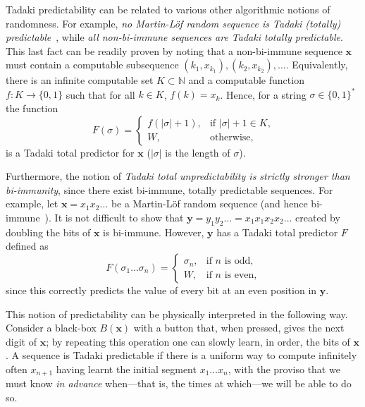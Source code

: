 \documentclass[%
 superscriptaddress,
 preprint,
 showpacs,
 showkeys,
 preprintnumbers,
 nofootinbib,
  amsmath,amssymb,
  aps,
 pra,
  longbibliography,
  floatfix,
 ]{revtex4-1}
\theoremstyle{definition}
\newcommand{\N}{\mathbb{N}}%
\newcommand{\x}{\mathbf{x}}
\newcommand{\y}{\mathbf{y}}
\begin{document}
Tadaki predictability can be related to various other algorithmic notions of randomness.
For example, \emph{no Martin-L\"of random sequence is Tadaki (totally) predictable}~\cite[Theorem~4]{Tadaki14}, while \emph{all non-bi-immune sequences are Tadaki totally predictable}.
This last fact can be readily proven by noting that a non-bi-immune sequence $\x$ must contain a computable subsequence $(k_1,x_{k_1}),(k_2,x_{k_2}),\dots$.
Equivalently, there is an infinite computable set $K\subset \N$ and a computable function $f:K\to \{0,1\}$ such that for all $k\in K$, $f(k)=x_k$.
Hence, for a string  $\sigma\in\{0,1\}^*$ the function $$F(\sigma)=\begin{cases} f(|\sigma|+1), & \text{if $|\sigma|+1\in K$,}\\ W, & \text{otherwise,}\end{cases}$$ is  a Tadaki total predictor for $\x$ ($|\sigma|$ is the length of $\sigma $).

Furthermore, the notion of \emph{Tadaki total unpredictability is strictly stronger than bi-immunity}, since there exist bi-immune, totally predictable sequences.
For example, let $\x=x_1x_2\dots$ be a Martin-L{\"o}f random sequence (and hence bi-immune~\cite{calude:02}).
It is not difficult to show that $\y=y_1y_2\dots = x_1 x_1 x_2 x_2\dots$ created by doubling the bits of $\x$ is bi-immune.
However, $\y$ has a Tadaki total predictor $F$ defined as $$F(\sigma_1 \dots \sigma_n) = \begin{cases} \sigma_n, & \text{if $n$ is odd,}\\ W, & \text{if $n$ is even,}\end{cases}$$ since this correctly predicts the value of every bit at an even position in $\y$.

This notion of predictability can be physically interpreted in the following way.
Consider a black-box $B(\x)$ with a button that, when pressed, gives the next digit of $\x$; by repeating this operation one can slowly learn, in order, the bits of $\x$.
A sequence is Tadaki predictable if there is a uniform way to compute infinitely often $x_{n+1}$ having learnt the initial segment $x_1\dots x_n$, with the proviso that we must know \emph{in advance} when---that is, the times at which---we will be able to do so.
\end{document}
